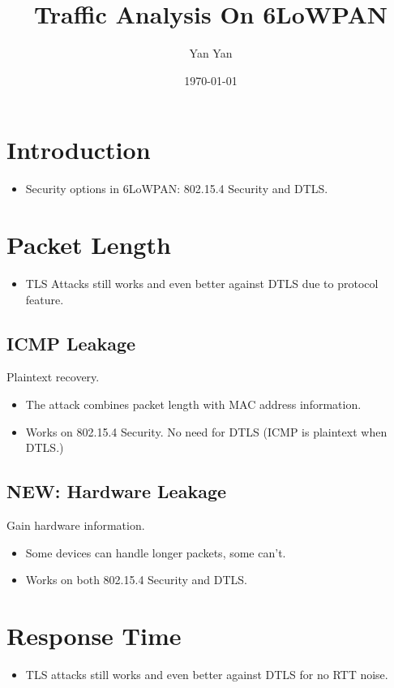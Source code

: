 \documentclass{article}
\title{Traffic Analysis On 6LoWPAN}
\author{Yan Yan}
\date{\today}
\begin{document}
\maketitle

\section{Introduction}

\begin{itemize}
	\item Security options in 6LoWPAN: 802.15.4 Security and DTLS.
\end{itemize}

\section{Packet Length}
\begin{itemize}
	\item TLS Attacks still works and even better against DTLS due to protocol feature.
\end{itemize}

\subsection{ICMP Leakage}
Plaintext recovery.
\begin{itemize}
	\item The attack combines packet length with MAC address information.
	\item Works on 802.15.4 Security. No need for DTLS (ICMP is plaintext when DTLS.)
\end{itemize}

\subsection{NEW: Hardware Leakage}
Gain hardware information.
\begin{itemize}
	\item Some devices can handle longer packets, some can't.
	\item Works on both 802.15.4 Security and DTLS.
\end{itemize}


\section{Response Time}
\begin{itemize}
	\item TLS attacks still works and even better against DTLS for no RTT noise. 
\end{itemize}
\end{document}
